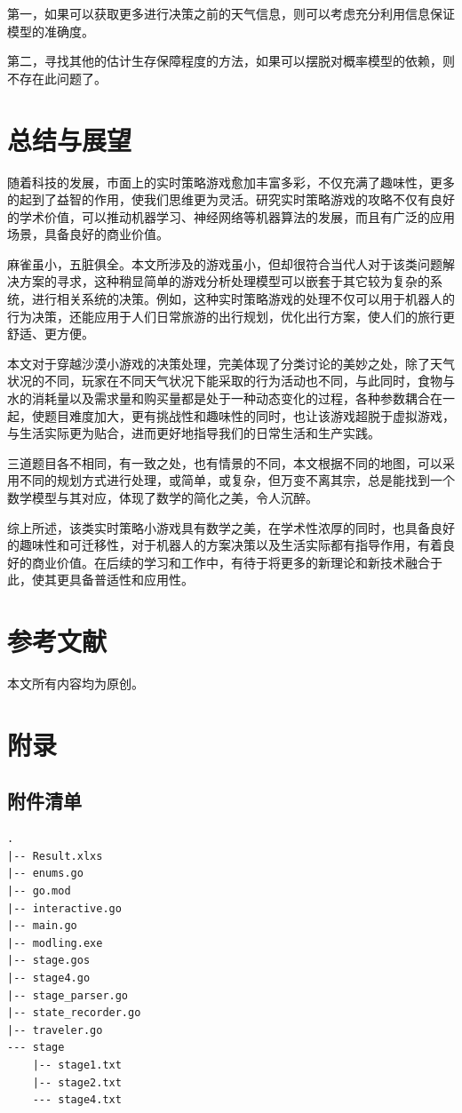 \documentclass[a4paper]{ctexart}
\begin{document}
第一，如果可以获取更多进行决策之前的天气信息，则可以考虑充分利用信息保证模型的准确度。

第二，寻找其他的估计生存保障程度的方法，如果可以摆脱对概率模型的依赖，则不存在此问题了。

\section{总结与展望}

随着科技的发展，市面上的实时策略游戏愈加丰富多彩，不仅充满了趣味性，更多的起到了益智的作用，使我们思维更为灵活。研究实时策略游戏的攻略不仅有良好的学术价值，可以推动机器学习、神经网络等机器算法的发展，而且有广泛的应用场景，具备良好的商业价值。

麻雀虽小，五脏俱全。本文所涉及的游戏虽小，但却很符合当代人对于该类问题解决方案的寻求，这种稍显简单的游戏分析处理模型可以嵌套于其它较为复杂的系统，进行相关系统的决策。例如，这种实时策略游戏的处理不仅可以用于机器人的行为决策，还能应用于人们日常旅游的出行规划，优化出行方案，使人们的旅行更舒适、更方便。

本文对于穿越沙漠小游戏的决策处理，完美体现了分类讨论的美妙之处，除了天气状况的不同，玩家在不同天气状况下能采取的行为活动也不同，与此同时，食物与水的消耗量以及需求量和购买量都是处于一种动态变化的过程，各种参数耦合在一起，使题目难度加大，更有挑战性和趣味性的同时，也让该游戏超脱于虚拟游戏，与生活实际更为贴合，进而更好地指导我们的日常生活和生产实践。

三道题目各不相同，有一致之处，也有情景的不同，本文根据不同的地图，可以采用不同的规划方式进行处理，或简单，或复杂，但万变不离其宗，总是能找到一个数学模型与其对应，体现了数学的简化之美，令人沉醉。

综上所述，该类实时策略小游戏具有数学之美，在学术性浓厚的同时，也具备良好的趣味性和可迁移性，对于机器人的方案决策以及生活实际都有指导作用，有着良好的商业价值。在后续的学习和工作中，有待于将更多的新理论和新技术融合于此，使其更具备普适性和应用性。

\section{参考文献}

本文所有内容均为原创。

\section{附录}

\subsection{附件清单}
\begin{verbatim}
.
|-- Result.xlxs
|-- enums.go
|-- go.mod
|-- interactive.go
|-- main.go
|-- modling.exe
|-- stage.gos
|-- stage4.go
|-- stage_parser.go
|-- state_recorder.go
|-- traveler.go
--- stage
    |-- stage1.txt
    |-- stage2.txt
    --- stage4.txt
\end{verbatim}
\end{document}
